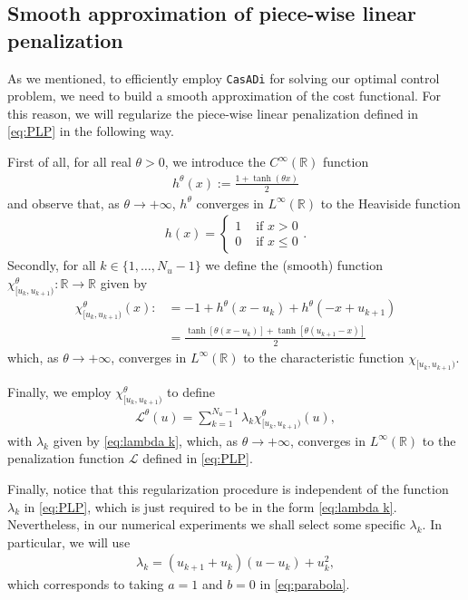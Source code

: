 \documentclass[twocolumn]{autart}    %
\begin{document}
\subsection{Smooth approximation of piece-wise linear penalization}

As we mentioned, to efficiently employ \texttt{CasADi} for solving our optimal control problem, we need to build a smooth approximation of the cost functional. For this reason, we will regularize the piece-wise linear penalization defined in \eqref{eq:PLP} in the following way.

First of all, for all real $\theta>0$, we introduce the $C^\infty(\mathbb{R})$ function
\begin{align*}
	\displaystyle h^\theta(x) := \frac{1 + \tanh(\theta x)}{2}
\end{align*}
and observe that, as $\theta\to +\infty$, $h^\theta$ converges in $L^\infty(\mathbb{R})$ to the Heaviside function 
\begin{align*}
    h(x) = \begin{cases}
        1 & \text{ if } x > 0 
        \\
		0 & \text{ if } x \leq 0
    \end{cases}.
\end{align*}
Secondly, for all $k \in \{1,\dots,N_u-1\}$ we define the (smooth) function $\chi_{[u_k,u_{k+1})}^\theta:\mathbb{R} \rightarrow \mathbb{R}$ given by
\begin{align*}
	\chi_{[u_k,u_{k+1})}^\theta(x) :&= - 1 + h^\theta(x-u_k) + h^\theta(-x+u_{k+1}) 
	\\[5pt]
	&= \frac{\tanh[\theta(x-u_k)] + \tanh[\theta (u_{k+1}-x)]}{2}
\end{align*}
which, as $\theta\to +\infty$, converges in $L^\infty(\mathbb{R})$ to the characteristic function $\chi_{[u_k,u_{k+1})}$.

Finally, we employ $\chi_{[u_k,u_{k+1})}^\theta$ to define
\begin{align}\label{eq:Lsmooth}
	\mathcal{L}^\theta(u) = \sum_{k = 1}^{N_u-1} \lambda_k \chi^\theta_{[u_k,u_{k+1})}(u),
\end{align}
with $\lambda_k$ given by \eqref{eq:lambda k}, which, as $\theta\to +\infty$, converges in $L^\infty(\mathbb{R})$ to the penalization function $\mathcal L$ defined in \eqref{eq:PLP}.

Finally, notice that this regularization procedure is independent of the function $\lambda_k$ in \eqref{eq:PLP}, which is just required to be in the form \eqref{eq:lambda k}. Nevertheless, in our numerical experiments we shall select some specific $\lambda_k$. In particular, we will use 
\begin{gather}
	\lambda_k = (u_{k+1}+u_{k}) (u-u_k) + u_k^2, 
\end{gather}
which corresponds to taking $a=1$ and $b=0$ in \eqref{eq:parabola}.
\end{document}
